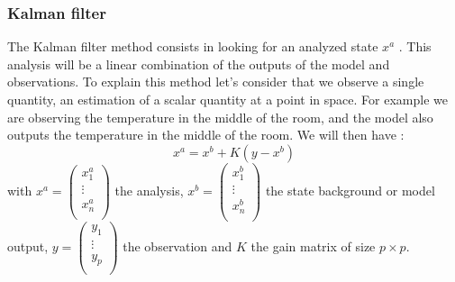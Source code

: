 \subsubsection{Kalman filter}
The Kalman filter method consists in looking for an analyzed state $x^a$ . This analysis will be a linear combination of the outputs of the model and observations.
To explain this method let's consider that we observe a single quantity, an estimation of a scalar quantity at a point in space. For example we are observing the temperature in the middle of the room, and the model also outputs the temperature in the middle of the room.  We will then have :
$$x^a=x^b+K(y-x^b)$$
with $x^a=\begin{pmatrix}
 x_1^a  \\ 
 \vdots \\
 x_n^a \\
\end{pmatrix}$ the analysis, $x^b=\begin{pmatrix}
 x_1^b  \\ 
 \vdots \\
 x_n^b \\
 \end{pmatrix}$ the state background or model output, $y=\begin{pmatrix}
 y_1  \\ 
 \vdots \\
 y_p \\
 \end{pmatrix}$ the observation and $K$ the gain matrix of size $p \times p$. 

